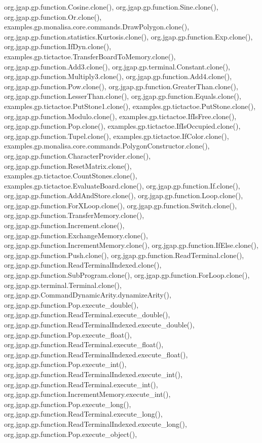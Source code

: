 org.\-jgap.\-gp.\-function.\-Cosine.\-clone(), org.\-jgap.\-gp.\-function.\-Sine.\-clone(), org.\-jgap.\-gp.\-function.\-Or.\-clone(), examples.\-gp.\-monalisa.\-core.\-commands.\-Draw\-Polygon.\-clone(), org.\-jgap.\-gp.\-function.\-statistics.\-Kurtosis.\-clone(), org.\-jgap.\-gp.\-function.\-Exp.\-clone(), org.\-jgap.\-gp.\-function.\-If\-Dyn.\-clone(), examples.\-gp.\-tictactoe.\-Transfer\-Board\-To\-Memory.\-clone(), org.\-jgap.\-gp.\-function.\-Add3.\-clone(), org.\-jgap.\-gp.\-terminal.\-Constant.\-clone(), org.\-jgap.\-gp.\-function.\-Multiply3.\-clone(), org.\-jgap.\-gp.\-function.\-Add4.\-clone(), org.\-jgap.\-gp.\-function.\-Pow.\-clone(), org.\-jgap.\-gp.\-function.\-Greater\-Than.\-clone(), org.\-jgap.\-gp.\-function.\-Lesser\-Than.\-clone(), org.\-jgap.\-gp.\-function.\-Equals.\-clone(), examples.\-gp.\-tictactoe.\-Put\-Stone1.\-clone(), examples.\-gp.\-tictactoe.\-Put\-Stone.\-clone(), org.\-jgap.\-gp.\-function.\-Modulo.\-clone(), examples.\-gp.\-tictactoe.\-If\-Is\-Free.\-clone(), org.\-jgap.\-gp.\-function.\-Pop.\-clone(), examples.\-gp.\-tictactoe.\-If\-Is\-Occupied.\-clone(), org.\-jgap.\-gp.\-function.\-Tupel.\-clone(), examples.\-gp.\-tictactoe.\-If\-Color.\-clone(), examples.\-gp.\-monalisa.\-core.\-commands.\-Polygon\-Constructor.\-clone(), org.\-jgap.\-gp.\-function.\-Character\-Provider.\-clone(), org.\-jgap.\-gp.\-function.\-Reset\-Matrix.\-clone(), examples.\-gp.\-tictactoe.\-Count\-Stones.\-clone(), examples.\-gp.\-tictactoe.\-Evaluate\-Board.\-clone(), org.\-jgap.\-gp.\-function.\-If.\-clone(), org.\-jgap.\-gp.\-function.\-Add\-And\-Store.\-clone(), org.\-jgap.\-gp.\-function.\-Loop.\-clone(), org.\-jgap.\-gp.\-function.\-For\-X\-Loop.\-clone(), org.\-jgap.\-gp.\-function.\-Switch.\-clone(), org.\-jgap.\-gp.\-function.\-Transfer\-Memory.\-clone(), org.\-jgap.\-gp.\-function.\-Increment.\-clone(), org.\-jgap.\-gp.\-function.\-Exchange\-Memory.\-clone(), org.\-jgap.\-gp.\-function.\-Increment\-Memory.\-clone(), org.\-jgap.\-gp.\-function.\-If\-Else.\-clone(), org.\-jgap.\-gp.\-function.\-Push.\-clone(), org.\-jgap.\-gp.\-function.\-Read\-Terminal.\-clone(), org.\-jgap.\-gp.\-function.\-Read\-Terminal\-Indexed.\-clone(), org.\-jgap.\-gp.\-function.\-Sub\-Program.\-clone(), org.\-jgap.\-gp.\-function.\-For\-Loop.\-clone(), org.\-jgap.\-gp.\-terminal.\-Terminal.\-clone(), org.\-jgap.\-gp.\-Command\-Dynamic\-Arity.\-dynamize\-Arity(), org.\-jgap.\-gp.\-function.\-Pop.\-execute\-\_\-double(), org.\-jgap.\-gp.\-function.\-Read\-Terminal.\-execute\-\_\-double(), org.\-jgap.\-gp.\-function.\-Read\-Terminal\-Indexed.\-execute\-\_\-double(), org.\-jgap.\-gp.\-function.\-Pop.\-execute\-\_\-float(), org.\-jgap.\-gp.\-function.\-Read\-Terminal.\-execute\-\_\-float(), org.\-jgap.\-gp.\-function.\-Read\-Terminal\-Indexed.\-execute\-\_\-float(), org.\-jgap.\-gp.\-function.\-Pop.\-execute\-\_\-int(), org.\-jgap.\-gp.\-function.\-Read\-Terminal\-Indexed.\-execute\-\_\-int(), org.\-jgap.\-gp.\-function.\-Read\-Terminal.\-execute\-\_\-int(), org.\-jgap.\-gp.\-function.\-Increment\-Memory.\-execute\-\_\-int(), org.\-jgap.\-gp.\-function.\-Pop.\-execute\-\_\-long(), org.\-jgap.\-gp.\-function.\-Read\-Terminal.\-execute\-\_\-long(), org.\-jgap.\-gp.\-function.\-Read\-Terminal\-Indexed.\-execute\-\_\-long(), org.\-jgap.\-gp.\-function.\-Pop.\-execute\-\_\-object(), 